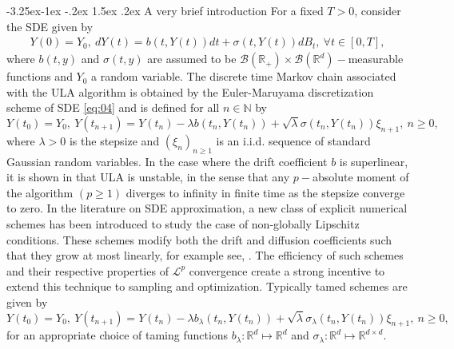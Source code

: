 \documentclass[a4paper, 10pt]{article}
\makeatletter
\theoremstyle{plain}%
\renewcommand\subsubsection{\@startsection{subsubsection}{3}{\z@}%
  {-3.25ex\@plus -1ex \@minus -.2ex}%
  {1.5ex \@plus .2ex}%
  {\normalfont\small\itshape\mdseries}}
\makeatother
\begin{document}
\subsubsection{A very brief introduction}
\noindent For a fixed $T>0$, consider the SDE given by
\begin{align}
    Y(0)=Y_0,\ dY(t)=b(t,Y(t))dt+\sigma(t,Y(t))dB_t,\ \forall t\in[0,T],\label{eq:04}
\end{align} where $b(t,y)$ and $\sigma(t,y)$ are assumed to be $\mathcal{B}(\mathbb{R}_+)\times \mathcal{B}(\mathbb{R}^d)-$measurable functions and $Y_0$ a random variable. The discrete time Markov chain associated with the ULA algorithm is obtained by the Euler-Maruyama discretization scheme of SDE \eqref{eq:04} and is defined for all $n\in\mathbb{N}$ by
$$Y(t_0)=Y_0,\ Y(t_{n+1})=Y(t_n)-\lambda b(t_n,Y(t_n))+\sqrt{\lambda}\sigma(t_n,Y(t_n))\xi_{n+1},\ n\geq 0,$$
where $\lambda>0$ is the stepsize and $\left(\xi_n\right)_{n\geq 1}$ is an i.i.d. sequence of standard Gaussian random variables. In the case where the drift coefficient $b$ is superlinear, it is shown in \cite{Hutzenthaler3} that ULA is unstable, in the sense that any $p-$absolute moment of the algorithm $(p\geq 1)$ diverges to infinity in finite time as the stepsize converge to zero. In the literature on SDE approximation, a new class of explicit numerical schemes has been introduced to study the case of non-globally Lipschitz conditions. These schemes modify both the drift and diffusion coefficients such that they grow at most linearly, for example see, \cite{kumar2016explicit,Sabanis_2016,Sabanis_2019}. The efficiency of such schemes and their respective properties of $\mathcal{L}^p$ convergence create a strong incentive to extend this technique to sampling and optimization. Typically tamed schemes are given by
$$Y(t_0)=Y_0,\ Y(t_{n+1})=Y(t_n)-\lambda b_{\lambda}(t_n,Y(t_n))+\sqrt{\lambda}\sigma_{\lambda}(t_n,Y(t_n))\xi_{n+1},\ n\geq 0,$$
for an appropriate choice of taming functions $b_{\lambda}:\mathbb{R}^d\mapsto \mathbb{R}^d$ and ${\sigma}_{\lambda}:\mathbb{R}^d\mapsto \mathbb{R}^{d\times d}$. 
\end{document}
